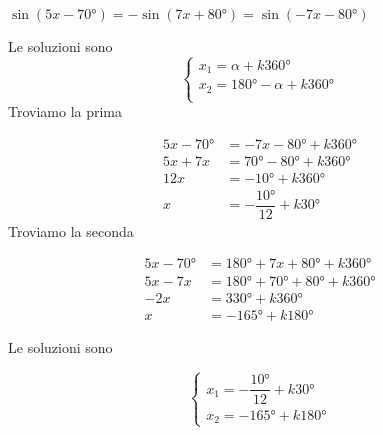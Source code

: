 $\sin(5x-\ang{70;;})=-\sin(7x +\ang{80;;})=\sin(-7x-\ang{80;;})$

	Le soluzioni sono
	\[\begin{cases}
	x_1=\alpha+k\ang{360;;}\\
	x_2=\ang{180;;}-\alpha+k\ang{360;;}\\
	\end{cases}\]
	Troviamo la prima

	\begin{align*}
		5x-\ang{70;;}&=-7x-\ang{80;;}+k\ang{360;;}\\
		5x+7x&=\ang{70;;}-\ang{80;;}+k\ang{360;;}\\
		12x&=-\ang{10;;}+k\ang{360;;}\\
		x&=-\dfrac{\ang{10;;}}{12}+k\ang{30;;}
	\end{align*}
	Troviamo la seconda

	\begin{align*}
		5x-\ang{70;;}&=\ang{180;;}+7x+\ang{80;;}+k\ang{360;;}\\
		5x-7x&=\ang{180;;}+\ang{70;;}+\ang{80;;}+k\ang{360;;}\\
		-2x&=\ang{330;;}+k\ang{360;;}\\
		x&=-\ang{165;;}+k\ang{180;;}
	\end{align*}

	Le soluzioni sono

	\[\begin{cases}
	x_1=-\dfrac{\ang{10;;}}{12}+k\ang{30;;}\\
	x_2=-\ang{165;;}+k\ang{180;;}
	\end{cases}\]
